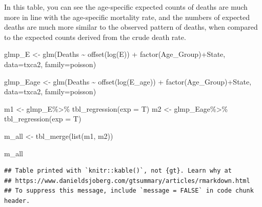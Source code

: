 \documentclass[
]{article}
\newenvironment{Shaded}{\begin{snugshade}}{\end{snugshade}}
\newcommand{\AttributeTok}[1]{\textcolor[rgb]{0.77,0.63,0.00}{#1}}
\newcommand{\FunctionTok}[1]{\textcolor[rgb]{0.00,0.00,0.00}{#1}}
\newcommand{\NormalTok}[1]{#1}
\newcommand{\OtherTok}[1]{\textcolor[rgb]{0.56,0.35,0.01}{#1}}
\newcommand{\SpecialCharTok}[1]{\textcolor[rgb]{0.00,0.00,0.00}{#1}}
\begin{document}
In this table, you can see the age-specific expected counts of deaths are much more in line with the age-specific mortality rate, and the numbers of expected deaths are much more similar to the observed pattern of deaths, when compared to the expected counts derived from the crude death rate.

\begin{Shaded}
\begin{Highlighting}[]
\NormalTok{glmp\_E }\OtherTok{\textless{}{-}} \FunctionTok{glm}\NormalTok{(Deaths }\SpecialCharTok{\textasciitilde{}} \FunctionTok{offset}\NormalTok{(}\FunctionTok{log}\NormalTok{(E)) }\SpecialCharTok{+} \FunctionTok{factor}\NormalTok{(Age\_Group)}\SpecialCharTok{+}\NormalTok{State,}
              \AttributeTok{data=}\NormalTok{txca2,}
              \AttributeTok{family=}\NormalTok{poisson)}

\NormalTok{glmp\_Eage }\OtherTok{\textless{}{-}} \FunctionTok{glm}\NormalTok{(Deaths }\SpecialCharTok{\textasciitilde{}} \FunctionTok{offset}\NormalTok{(}\FunctionTok{log}\NormalTok{(E\_age)) }\SpecialCharTok{+} \FunctionTok{factor}\NormalTok{(Age\_Group)}\SpecialCharTok{+}\NormalTok{State,}
              \AttributeTok{data=}\NormalTok{txca2,}
              \AttributeTok{family=}\NormalTok{poisson)}

\NormalTok{m1 }\OtherTok{\textless{}{-}}\NormalTok{ glmp\_E}\SpecialCharTok{\%\textgreater{}\%}
  \FunctionTok{tbl\_regression}\NormalTok{(}\AttributeTok{exp =}\NormalTok{ T)}
\NormalTok{m2 }\OtherTok{\textless{}{-}}\NormalTok{ glmp\_Eage}\SpecialCharTok{\%\textgreater{}\%}
  \FunctionTok{tbl\_regression}\NormalTok{(}\AttributeTok{exp =}\NormalTok{ T)}

\NormalTok{m\_all }\OtherTok{\textless{}{-}} \FunctionTok{tbl\_merge}\NormalTok{(}\FunctionTok{list}\NormalTok{(m1, m2))}

\NormalTok{m\_all}
\end{Highlighting}
\end{Shaded}

\begin{verbatim}
## Table printed with `knitr::kable()`, not {gt}. Learn why at
## https://www.danieldsjoberg.com/gtsummary/articles/rmarkdown.html
## To suppress this message, include `message = FALSE` in code chunk header.
\end{verbatim}
\end{document}
